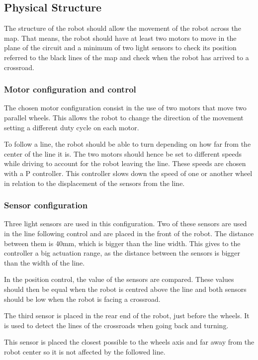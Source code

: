 \subsection{Physical Structure}
The structure of the robot should allow the movement of the robot across the map. 
That means, the robot should have at least two motors to move in the plane of the circuit and a minimum of two light sensors to check its position referred to the black lines of the map and check when the robot has arrived to a crossroad.

\subsubsection{Motor configuration and control}
The chosen motor configuration consist in the use of two motors that move two parallel wheels. 
This allows the robot to change the direction of the movement setting a different duty cycle on each motor.

To follow a line, the robot should be able to turn depending on how far from the center of the line it is.
The two motors should hence be set to different speeds while driving to account for the robot leaving the line.
These speeds are chosen with a P controller.
This controller slows down the speed of one or another wheel in relation to the displacement of the sensors from the line. 


\subsubsection{Sensor configuration}

Three light sensors are used in this configuration. 
Two of these sensors are used in the line following control and are placed in the front of the robot.
The distance between them is 40mm, which is bigger than the line width.
This gives to the controller a big actuation range, as the distance between the sensors is bigger than the width of the line.

In the position control, the value of the sensors are compared.
These values should then be equal when the robot is centred above the line
and both sensors should be low when the robot is facing a crossroad.

The third sensor is placed in the rear end of the robot, just before the wheels.
It is used to detect the lines of the crossroads when going back and turning.

This sensor is placed the closest possible to the wheels axis and far away from the robot center so it is not affected by the followed line.

